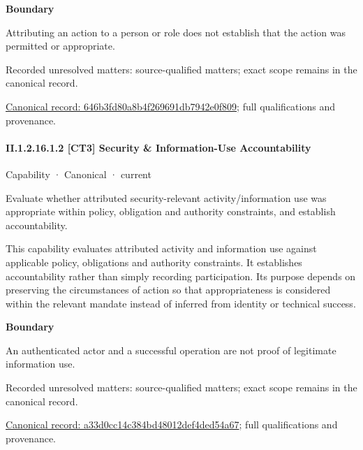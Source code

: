\textbf{Boundary}



Attributing an action to a person or role does not establish that the action was permitted or appropriate.


{\small Recorded unresolved matters: source-qualified matters; exact scope remains in the canonical record.}\par
{\footnotesize \href{../../../../continuum/strategy/capability/646b3fd80a8b4f269691db7942e0f809.md}{Canonical record: 646b3fd80a8b4f269691db7942e0f809}; full qualifications and provenance.}\par
\paragraph*{II.1.2.16.1.2 [CT3] Security \& Information-Use Accountability}
\label{navigation:II.1.2.16.1.2}

\label{element:a33d0cc14c384bd48012def4ded54a67}
{\small Capability · Canonical · current}\par

Evaluate whether attributed security-relevant activity/information use was appropriate within policy, obligation and authority constraints, and establish accountability.



This capability evaluates attributed activity and information use against applicable policy, obligations and authority constraints. It establishes accountability rather than simply recording participation. Its purpose depends on preserving the circumstances of action so that appropriateness is considered within the relevant mandate instead of inferred from identity or technical success.



\textbf{Boundary}



An authenticated actor and a successful operation are not proof of legitimate information use.


{\small Recorded unresolved matters: source-qualified matters; exact scope remains in the canonical record.}\par
{\footnotesize \href{../../../../continuum/strategy/capability/a33d0cc14c384bd48012def4ded54a67.md}{Canonical record: a33d0cc14c384bd48012def4ded54a67}; full qualifications and provenance.}\par
